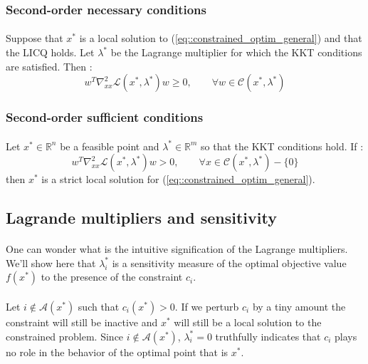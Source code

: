 \documentclass[a4paper]{article}
\begin{document}
{{{			\subsubsection{Second-order necessary conditions}
			{
				\paragraph{}Suppose that $x^*$ is a local solution to (\ref{eq::constrained_optim_general}) and that the LICQ holds. Let $\lambda^*$ be the Lagrange multiplier for which the KKT conditions are satisfied. Then : 
				\begin{equation}
					w^T\nabla_{xx}^2 \mathcal{L}(x^*,\lambda^*) w \geq 0, \qquad \forall w \in\mathcal{C}(x^*,\lambda^*) 
				\end{equation} 
			}
			\subsubsection{Second-order sufficient conditions}
			{
				\paragraph{} Let $x^*\in\mathbb{R}^n$ be a feasible point and $\lambda^*\in\mathbb{R}^m$ so that the KKT conditions hold. If : 
				\begin{equation}
					w^T\nabla_{xx}^2\mathcal{L}(x^*,\lambda^*) w > 0, \qquad \forall x\in\mathcal{C}(x^*,\lambda^*)-\{0\}
				\end{equation}
				then $x^*$ is a strict local solution for (\ref{eq::constrained_optim_general}). 
			}
		}
		
		\subsection{Lagrande multipliers and sensitivity}
		{
			\paragraph{} One can wonder what is the intuitive signification of the Lagrange multipliers. We'll show here that $\lambda_i^*$ is a sensitivity measure of the optimal objective value $f(x^*)$ to the presence of the constraint $c_i$. 
			
			\paragraph{} Let $i\notin\mathcal{A}(x^*)$ such that $c_i(x^*)>0$. If we perturb $c_i$ by a tiny amount the constraint will still be inactive and $x^*$ will still be a local solution to the constrained problem. Since $i\notin\mathcal{A}(x^*)$, $\lambda_i^*=0$ truthfully indicates that $c_i$ plays no role in the behavior of the optimal point that is $x^*$. 
			
}}}
\end{document}
